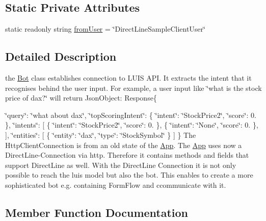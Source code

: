 \subsection*{Static Private Attributes}
\begin{DoxyCompactItemize}
\item 
static readonly string \hyperlink{class_listen_to_me_1_1_bot_adeb0c25a77e095d890c32da6f06ed669}{from\+User} = \char`\"{}Direct\+Line\+Sample\+Client\+User\char`\"{}
\end{DoxyCompactItemize}


\subsection{Detailed Description}
the \hyperlink{class_listen_to_me_1_1_bot}{Bot} class establishes connection to L\+U\+IS A\+PI. It extracts the intent that it recognises behind the user input. For example, a user input like \char`\"{}what is the stock price of dax?\char`\"{} will return Json\+Object\+: Response\{ 

\char`\"{}query\char`\"{}\+: \char`\"{}what about dax\char`\"{}, \char`\"{}top\+Scoring\+Intent\char`\"{}\+: \{ \char`\"{}intent\char`\"{}\+: \char`\"{}\+Stock\+Price2\char`\"{}, \char`\"{}score\char`\"{}\+: 0. \}, \char`\"{}intents\char`\"{}\+: \mbox{[} \{ \char`\"{}intent\char`\"{}\+: \char`\"{}\+Stock\+Price2\char`\"{}, \char`\"{}score\char`\"{}\+: 0. \}, \{ \char`\"{}intent\char`\"{}\+: \char`\"{}\+None\char`\"{}, \char`\"{}score\char`\"{}\+: 0. \}, \mbox{]}, \char`\"{}entities\char`\"{}\+: \mbox{[} \{ \char`\"{}entity\char`\"{}\+: \char`\"{}dax\char`\"{}, \char`\"{}type\char`\"{}\+: \char`\"{}\+Stock\+Symbol\char`\"{} \} \mbox{]} \} The Http\+Client\+Connection is from an old state of the \hyperlink{class_listen_to_me_1_1_app}{App}. The \hyperlink{class_listen_to_me_1_1_app}{App} uses now a Direct\+Line-\/\+Connection via http. Therefore it contains methods and fields that support Direct\+Line as well. With the Direct\+Line Connection it is not only possible to reach the luis model but also the bot. This enables to create a more sophisticated bot e.\+g. containing Form\+Flow and ccommunicate with it. 

\subsection{Member Function Documentation}
